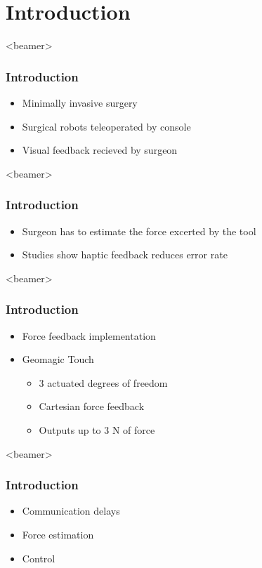 \section{Introduction}
\begin{frame}<beamer>
\frametitle{Introduction}
\begin{itemize}
\item Minimally invasive surgery 
\item Surgical robots teleoperated by console

\item Visual feedback recieved by surgeon
\end{itemize}
\end{frame}

\begin{frame}<beamer>
\frametitle{Introduction}
\begin{itemize}
\item Surgeon has to estimate the force excerted by the tool
\item Studies show haptic feedback reduces error rate
\end{itemize}
\end{frame}

\begin{frame}<beamer>
\frametitle{Introduction}
\begin{itemize}
\item Force feedback implementation
\item Geomagic Touch 
\begin{itemize}
\item 3 actuated degrees of freedom 
\item Cartesian force feedback
\item Outputs up to 3 N of force
\end{itemize}
\end{itemize}
\end{frame}

\begin{frame}<beamer>
\frametitle{Introduction}
\begin{itemize}
\item Communication delays
\item Force estimation
\item Control
\end{itemize}
\end{frame}